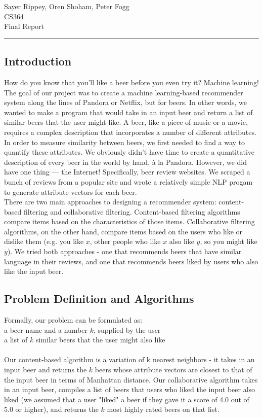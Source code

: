 \documentclass[11pt]{article}
\renewcommand{\maketitle}{
  \begin{center}
    \begin{flushright}
      Sayer Rippey, Oren Shoham, Peter Fogg \\
      CS364 \\
      Final Report
    \end{flushright}
    \rule{\linewidth}{0.1mm}
  \end{center}
}
\begin{document}
\maketitle
\subsection*{Introduction}
How do you know that you'll like a beer before you even try it? Machine learning! The goal of our project was to create a machine learning-based recommender system along the lines of Pandora or Netflix, but for beers. In other words, we wanted to make a program that would take in an input beer and return a list of similar beers that the user might like. A beer, like a piece of music or a movie, requires a complex description that incorporates a number of different attributes. In order to measure similarity between beers, we first needed to find a way to quantify these attributes. We obviously didn't have time to create a quantitative description of every beer in the world by hand, \`{a} la Pandora. However, we did have one thing --- the Internet! Specifically, beer review websites. We scraped a bunch of reviews from a popular site and wrote a relatively simple NLP progam to generate attribute vectors for each beer.  \\
\indent There are two main approaches to designing a recommender system: content-based filtering and collaborative filtering. Content-based filtering algorithms compare items based on the characteristics of those items. Collaborative filtering algorithms, on the other hand, compare items based on the users who like or dislike them (e.g. you like $x$, other people who like $x$ also like $y$, so you might like $y$). We tried both approaches - one that recommends beers that have similar language in their reviews, and one that recommends beers liked by users who also like the input beer.

\subsection*{Problem Definition and Algorithms}
Formally, our problem can be formulated as: \\
 a beer name and a number $k$, supplied by the user \\
 a list of $k$ similar beers that the user might also like \\
\\
Our content-based algorithm is a variation of k nearest neighbors - it takes in an input beer and returns the $k$ beers whose attribute vectors are closest to that of the input beer in terms of Manhattan distance. Our collaborative algorithm takes in an input beer, compiles a list of beers that users who liked the input beer also liked (we assumed that a user "liked"  a beer if they gave it a score of 4.0 out of 5.0 or higher), and returns the $k$ most highly rated beers on that list.
\end{document}
